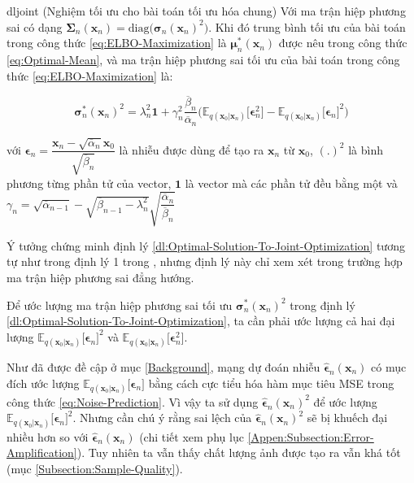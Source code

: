\documentclass[14pt, a4paper]{article}
\numberwithin{equation}{section}
\numberwithin{figure}{section}
\numberwithin{dl}{section}
\numberwithin{md}{section}
\numberwithin{bd}{section}
\numberwithin{dn}{section}
\numberwithin{hq}{section}
\begin{document}
    \begin{restatable}{dl}{joint} \label{dl:Optimal-Solution-To-Joint-Optimization}
        (Nghiệm tối ưu cho bài toán tối ưu hóa chung) 
        Với ma trận hiệp phương sai có dạng $\boldsymbol{\Sigma}_n (\boldsymbol{x}_n)=\mathrm{diag}\big( \boldsymbol{\sigma}_n (\boldsymbol{x}_n)^2 \big)$.
        Khi đó trung bình tối ưu của bài toán trong công thức \ref{eq:ELBO-Maximization} là $\boldsymbol{\mu}_n^{\ast} (\boldsymbol{x}_n)$ được nêu trong công thức \ref{eq:Optimal-Mean},
        và ma trận hiệp phương sai tối ưu của bài toán trong công thức \ref{eq:ELBO-Maximization} là:


        \begin{equation*}
            \boldsymbol{\sigma}_n^{\ast} (\boldsymbol{x}_n)^2 = \lambda_n^2 \boldsymbol{1} + \gamma_n^2 \dfrac{\overline{\beta}_n}{\overline{\alpha}_n} \big( \mathbb{E}_{q(\boldsymbol{x}_0 \vert \boldsymbol{x}_n)} \lbrack \boldsymbol{\epsilon}_n^2 \rbrack - \mathbb{E}_{q(\boldsymbol{x}_0 \vert \boldsymbol{x}_n)} \lbrack \boldsymbol{\epsilon}_n \rbrack^2 \big)
        \end{equation*}

        với $\boldsymbol{\epsilon}_n = \dfrac{\boldsymbol{x}_n - \sqrt{\overline{\alpha}_n} \boldsymbol{x}_0}{\sqrt{\overline{\beta}_n}}$ là nhiễu được dùng để tạo ra $\boldsymbol{x}_n$ từ $\boldsymbol{x}_0$,
        $(.)^2$ là bình phương từng phần tử của vector, $\boldsymbol{1}$ là vector mà các phần tử đều bằng một và $\gamma_n = \sqrt{\overline{\alpha}_{n-1}} - \sqrt{\overline{\beta}_{n-1} - \lambda_n^2} \sqrt{\dfrac{\overline{\alpha}_n}{\overline{\beta}_n}}$
    \end{restatable}

    Ý tưởng chứng minh định lý \ref{dl:Optimal-Solution-To-Joint-Optimization} tương tự như trong định lý 1 trong \cite{bao2021analytic}, nhưng định lý này chỉ xem xét trong trường hợp ma trận hiệp phương sai đẳng hướng.

    Để ước lượng ma trận hiệp phương sai tối ưu $\boldsymbol{\sigma}_n^{\ast} (\boldsymbol{x}_n)^2$ trong định lý \ref{dl:Optimal-Solution-To-Joint-Optimization}, ta cần phải ước lượng cả hai đại lượng $\mathbb{E}_{q(\boldsymbol{x}_0 \vert \boldsymbol{x}_n)} \lbrack \boldsymbol{\epsilon}_n \rbrack^2$ và $\mathbb{E}_{q(\boldsymbol{x}_0 \vert \boldsymbol{x}_n)} \lbrack \boldsymbol{\epsilon}_n^2 \rbrack$.

    Như đã được đề cập ở mục \ref{Background}, mạng dự đoán nhiễu $\hat{\boldsymbol{\epsilon}}_n (\boldsymbol{x}_n)$ có mục đích ước lượng $\mathbb{E}_{q(\boldsymbol{x}_0 \vert \boldsymbol{x}_n)} \lbrack \boldsymbol{\epsilon}_n \rbrack$ bằng cách cực tiểu hóa hàm mục tiêu MSE trong công thức \ref{eq:Noise-Prediction}.
    Vì vậy ta sử dụng $\hat{\boldsymbol{\epsilon}}_n (\boldsymbol{x}_n)^2$ để ước lượng $\mathbb{E}_{q(\boldsymbol{x}_0 \vert \boldsymbol{x}_n)} \lbrack \boldsymbol{\epsilon}_n \rbrack^2$.
    Nhưng cần chú ý rằng sai lệch của $\hat{\boldsymbol{\epsilon}}_n (\boldsymbol{x}_n)^2$ sẽ bị khuếch đại nhiều hơn so với $\hat{\boldsymbol{\epsilon}}_n (\boldsymbol{x}_n)$ (chi tiết xem phụ lục \ref{Appen:Subsection:Error-Amplification}).
    Tuy nhiên ta vẫn thấy chất lượng ảnh được tạo ra vẫn khá tốt (mục \ref{Subsection:Sample-Quality}).
\end{document}

